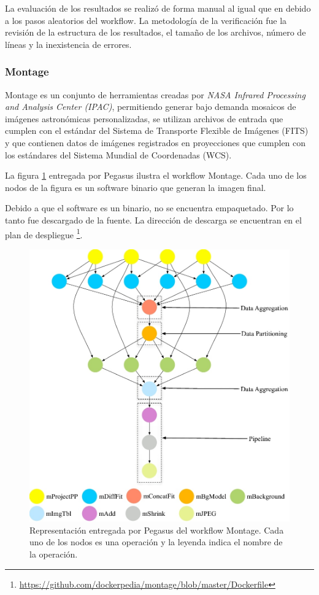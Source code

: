 La evaluación de los resultados se realizó de forma manual al igual que en \cite{santana2017reproducibility} debido a los pasos aleatorios del workflow. La metodología de la verificación fue la revisión de la estructura de los resultados, el tamaño de los archivos, número de líneas y la inexistencia de errores.

\subsubsection{Montage}

Montage es un conjunto de herramientas creadas por \textit{NASA Infrared Processing and Analysis Center (IPAC)}, permitiendo generar bajo demanda mosaicos de imágenes astronómicas personalizadas, se utilizan archivos de entrada que cumplen con el estándar del Sistema de Transporte Flexible de Imágenes (FITS) y que contienen datos de imágenes registrados en proyecciones que cumplen con los estándares del Sistema Mundial de Coordenadas (WCS).

La figura \ref{fig:montage} entregada por Pegasus ilustra el workflow Montage. Cada uno de los nodos de la figura es un software binario que generan la imagen final.

Debido a que el software es un binario, no se encuentra empaquetado. Por lo tanto fue descargado de la fuente. La dirección de descarga se encuentran en el plan de despliegue \footnote{\url{https://github.com/dockerpedia/montage/blob/master/Dockerfile}}. 

\begin{figure}[t]
\centering
\includegraphics[width=.5\textwidth]{Figures/montage}
\caption[Representación workflow: Montage]{Representación entregada por Pegasus del workflow Montage. Cada uno de los nodos es una operación y la leyenda indica el nombre de la operación.}\label{fig:montage}
\end{figure}


